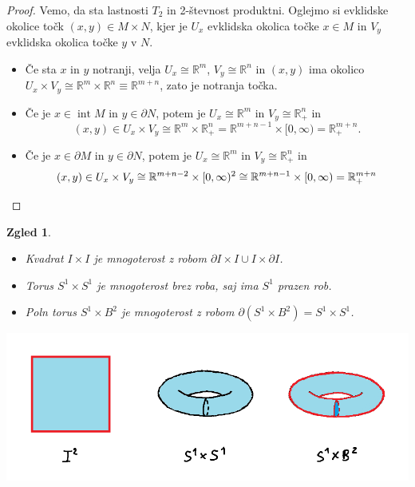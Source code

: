 \documentclass[10pt, a4paper]{article}
\newtheorem{zgled}[izr]{Zgled}
\newenvironment{noticeC}{%
  \tcolorbox[%
  notitle,
  empty,
  enhanced,  %
  breakable,
  coltext=black, 
  fontupper=\rmfamily,
  noparskip,
  sharp corners,
  boxrule=-1pt,  %
  frame hidden,
  left=7pt,  %
  right=7pt,
  top=5pt,
  bottom=5pt,
  before skip=2.5ex plus 2pt,
  after skip=2.5ex plus 2pt,
  overlay unbroken and last={%
  },
  ]}
{\endtcolorbox}
\newenvironment{dokaz}%
  {\begin{noticeC}\begin{proof}}%
  {\end{proof}\end{noticeC}}
\newcommand{\R}{\mathbb {R}}
\DeclareMathOperator{\intem}{int}
\begin{document}
\begin{dokaz}
  Vemo, da sta lastnosti $T_2$ in 2-števnost produktni.
  Oglejmo si evklidske okolice točk $(x, y) \in M \times N$, kjer je 
  $U_x$ evklidska okolica točke $x \in M$ in $V_y$ evklidska okolica točke 
  $y$ v $N$.
  \begin{itemize}
    \item Če sta $x$ in $y$ notranji, velja $U_x \cong \R^m$, $V_y \cong \R^n$ in 
    $(x, y)$ ima okolico $U_x \times V_y \cong \R^m \times \R^n \equiv \R^{m + n}$,
    zato je notranja točka.
    \item Če je $x \in \intem M$ in $y \in \partial N$, potem je $U_x \cong \R^m$ in $V_y \cong \R^n _+$
    in $$(x, y) \in U_x \times V_y \cong \R^m \times \R^n_+ = \R^{m + n-1} \times [0, \infty) = \R^{m + n}_+.$$
    \item Če je $x \in \partial M$ in $y \in \partial N$, potem je $U_x \cong \R^m$ in $V_y \cong \R^n _+$ in 
    \begin{equation*}
      (x, y) \in U_x \times V_y \cong \R^{m + n - 2} \times [0, \infty)^2 \cong \R^{m + n - 1} \times [0, \infty) = \R^{m + n}_+ \qedhere 
    \end{equation*}
  \end{itemize}
\end{dokaz}

\begin{zgled}
  \begin{itemize}
    \item Kvadrat $I \times I$ je mnogoterost z robom $\partial I \times I \cup I \times \partial I$.
    \item Torus $S^1 \times S^1$ je mnogoterost brez roba, saj ima $S^1$ prazen rob.
    \item Poln torus $S^1 \times B^2$ je mnogoterost z robom $\partial (S^1 \times B^2) = S^1 \times S^1$.
  \end{itemize}
  \begin{center}
    \includegraphics[scale=0.6]{torus.png}
  \end{center}
\end{zgled}
\end{document}
